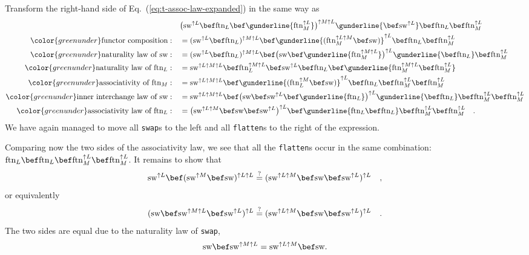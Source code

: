 Transform the right-hand side of Eq.~(\ref{eq:t-assoc-law-expanded})
in the same way as
\begin{align*}
 & \big(\text{sw}^{\uparrow L}\bef\text{ftn}_{L}\bef\gunderline{\text{ftn}_{M}^{\uparrow L}}\big)^{\uparrow M\uparrow L}\gunderline{\bef\text{sw}^{\uparrow L}}\bef\text{ftn}_{L}\bef\text{ftn}_{M}^{\uparrow L}\\
{\color{greenunder}\text{functor composition}:}\quad & =(\text{sw}^{\uparrow L}\bef\text{ftn}_{L})^{\uparrow M\uparrow L}\bef\gunderline{(\text{ftn}_{M}^{\uparrow L\uparrow M}\bef\text{sw})}^{\uparrow L}\bef\text{ftn}_{L}\bef\text{ftn}_{M}^{\uparrow L}\\
{\color{greenunder}\text{naturality law of }\text{sw}:}\quad & =(\text{sw}^{\uparrow L}\bef\text{ftn}_{L})^{\uparrow M\uparrow L}\bef\big(\text{sw}\bef\gunderline{\text{ftn}_{M}^{\uparrow M\uparrow L}}\big)^{\uparrow L}\gunderline{\bef\text{ftn}_{L}}\bef\text{ftn}_{M}^{\uparrow L}\\
{\color{greenunder}\text{naturality law of }\text{ftn}_{L}:}\quad & =\text{sw}^{\uparrow L\uparrow M\uparrow L}\bef\text{ftn}_{L}^{\uparrow M\uparrow L}\bef\text{sw}^{\uparrow L}\bef\text{ftn}_{L}\bef\gunderline{\text{ftn}_{M}^{\uparrow M\uparrow L}\bef\text{ftn}_{M}^{\uparrow L}}\\
{\color{greenunder}\text{associativity of }\text{ftn}_{M}:}\quad & =\text{sw}^{\uparrow L\uparrow M\uparrow L}\bef\gunderline{(\text{ftn}_{L}^{\uparrow M}\bef\text{sw})}^{\uparrow L}\bef\text{ftn}_{L}\bef\text{ftn}_{M}^{\uparrow L}\bef\text{ftn}_{M}^{\uparrow L}\\
{\color{greenunder}\text{inner interchange law of }\text{sw}:}\quad & =\text{sw}^{\uparrow L\uparrow M\uparrow L}\bef\big(\text{sw}\bef\text{sw}^{\uparrow L}\bef\gunderline{\text{ftn}_{L}}\big)^{\uparrow L}\gunderline{\bef\text{ftn}_{L}}\bef\text{ftn}_{M}^{\uparrow L}\bef\text{ftn}_{M}^{\uparrow L}\\
{\color{greenunder}\text{associativity law of }\text{ftn}_{L}:}\quad & =\big(\text{sw}^{\uparrow L\uparrow M}\bef\text{sw}\bef\text{sw}^{\uparrow L}\big)^{\uparrow L}\bef\gunderline{\text{ftn}_{L}\bef\text{ftn}_{L}}\bef\text{ftn}_{M}^{\uparrow L}\bef\text{ftn}_{M}^{\uparrow L}\quad.
\end{align*}
We have again managed to move all \lstinline!swap!s to the left and
all \lstinline!flatten!s to the right of the expression. 

Comparing now the two sides of the associativity law, we see that
all the \lstinline!flatten!s occur in the same combination: $\text{ftn}_{L}\bef\text{ftn}_{L}\bef\text{ftn}_{M}^{\uparrow L}\bef\text{ftn}_{M}^{\uparrow L}$.
It remains to show that 
\[
\text{sw}^{\uparrow L}\bef(\text{sw}^{\uparrow M}\bef\text{sw})^{\uparrow L\uparrow L}\overset{?}{=}(\text{sw}^{\uparrow L\uparrow M}\bef\text{sw}\bef\text{sw}^{\uparrow L})^{\uparrow L}\quad,
\]
or equivalently
\[
(\text{sw}\bef\text{sw}^{\uparrow M\uparrow L}\bef\text{sw}^{\uparrow L})^{\uparrow L}\overset{?}{=}(\text{sw}^{\uparrow L\uparrow M}\bef\text{sw}\bef\text{sw}^{\uparrow L})^{\uparrow L}\quad.
\]
The two sides are equal due to the naturality law of \texttt{}\lstinline!swap!,
\[
\text{sw}\bef\text{sw}^{\uparrow M\uparrow L}=\text{sw}^{\uparrow L\uparrow M}\bef\text{sw}.
\]

